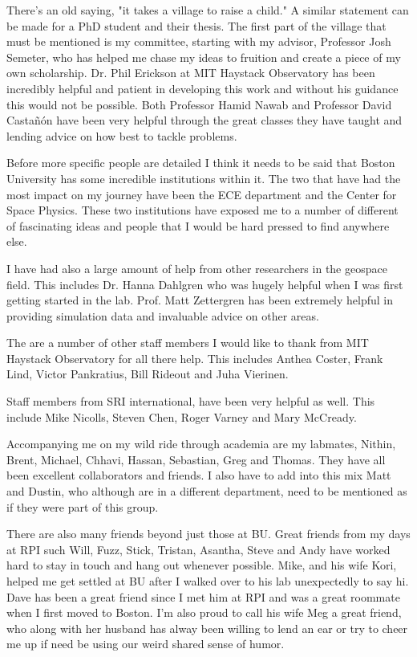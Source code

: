 There's an old saying, "it takes a village to raise a child." A similar statement can be made for a PhD student and their thesis. The first part of the village that must be mentioned is my committee, starting with my advisor, Professor Josh Semeter, who has helped me chase my ideas to fruition and create a piece of my own scholarship. Dr. Phil Erickson at MIT Haystack Observatory has been incredibly helpful and patient in developing this work and without his guidance this would not be possible. Both Professor Hamid Nawab and Professor David Castañón have been very helpful through the great classes they have taught and lending advice on how best to tackle problems.

Before more specific people are detailed I think it needs to be said that Boston University has some incredible institutions within it. The two that have had the most impact on my journey have been the ECE department and the Center for Space Physics. These two institutions have exposed me to a number of different of fascinating ideas and people that I would be hard pressed to find anywhere else.

I have had also a large amount of help from other researchers in the geospace field. This includes Dr. Hanna Dahlgren who was hugely helpful when I was first getting started in the lab. Prof. Matt Zettergren has been extremely helpful in providing simulation data and invaluable advice on other areas.

The are a number of other staff members I would like to thank from MIT Haystack Observatory for all there help. This includes Anthea Coster, Frank Lind, Victor Pankratius, Bill Rideout and Juha Vierinen. 

Staff members from SRI international, have been very helpful as well. This include Mike Nicolls, Steven Chen, Roger Varney and Mary McCready.
 
Accompanying me on my wild ride through academia are my labmates, Nithin, Brent, Michael, Chhavi, Hassan, Sebastian, Greg and Thomas. They have all been excellent collaborators and friends. I also have to add into this mix Matt and Dustin, who although are in a different department, need to be mentioned as if they were part of this group.

There are also many friends beyond just those at BU. Great friends from my days at RPI such Will, Fuzz, Stick, Tristan, Asantha, Steve and Andy have worked hard to stay in touch and hang out whenever possible. Mike, and his wife Kori, helped me get settled at BU after I walked over to his lab unexpectedly to say hi. Dave has been a great friend since I met him at RPI and was a great roommate when I first moved to Boston. I'm also proud to call his wife Meg a great friend, who along with her husband has alway been willing to lend an ear or try to cheer me up if need be using our weird shared sense of humor.

